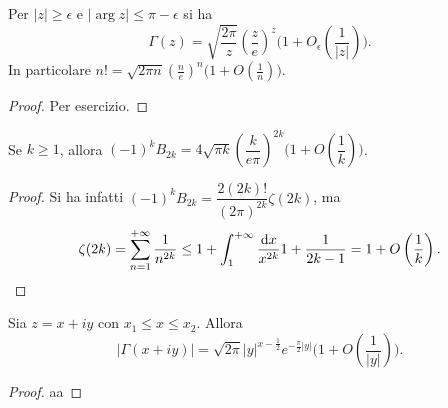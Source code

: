 \begin{cor}
  Per $|z| \ge \epsilon$ e $|\arg{z}| \le \pi-\epsilon$ si ha
  $$\Gamma(z)=\sqrt{\frac{2\pi}{z}}\left(\frac{z}{e}\right)^z\Bigg(1+O_{\epsilon}\left(\frac{1}{|z|}\right)\Bigg).$$
  In particolare $\displaystyle n!=\sqrt{2\pi n}\left(\frac{n}{e}\right)^n\Bigg(1+O\left(\frac{1}{n}\right)\Bigg)$.
\end{cor}

\begin{proof}
  Per esercizio.
\end{proof}

\begin{cor}
  Se $k \ge 1$, allora $(-1)^kB_{2k}=4\sqrt{\pi k}\left(\dfrac{k}{e\pi}\right)^{2k}\Bigg(1+O\left(\dfrac{1}{k}\right)\Bigg)$.
\end{cor}

\begin{proof}
  Si ha infatti $(-1)^kB_{2k}=\dfrac{2(2k)!}{(2\pi)^{2k}}\zeta(2k)$, ma
  $$\zeta(2k)=\sum_{n=1}^{+\infty} \frac{1}{n^{2k}} \le 1+\int_1^{+\infty} \frac{\mathop{}\!\mathrm{d} x}{x^{2k}} 1+\frac{1}{2k-1}=1+O\left(\frac{1}{k}\right).$$
\end{proof}

\begin{cor}
  Sia $z=x+iy$ con $x_1 \le x \le x_2$. Allora
  $$\left|\Gamma(x+iy)\right|=\sqrt{2\pi}|y|^{x-\frac{1}{2}}e^{-\frac{\pi}{2}|y|}\Bigg(1+O\left(\frac{1}{|y|}\right)\Bigg).$$
\end{cor}

\begin{proof}
  aa
\end{proof}
